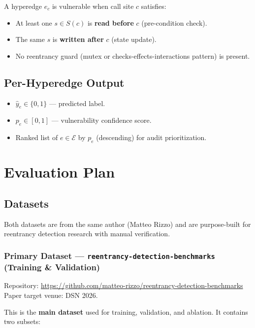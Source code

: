 \documentclass[11pt]{article}
\begin{document}
A hyperedge $e_c$ is vulnerable when call site $c$ satisfies:
\begin{itemize}
    \item At least one $s \in S(c)$ is \textbf{read before} $c$ (pre-condition check).
    \item The same $s$ is \textbf{written after} $c$ (state update).
    \item No reentrancy guard (mutex or checks-effects-interactions pattern) is present.
\end{itemize}

\subsection{Per-Hyperedge Output}

\begin{itemize}
    \item $\hat{y}_e \in \{0,1\}$ --- predicted label.
    \item $p_e \in [0,1]$ --- vulnerability confidence score.
    \item Ranked list of $e \in \mathcal{E}$ by $p_e$ (descending) for audit prioritization.
\end{itemize}

\section{Evaluation Plan}

\subsection{Datasets}

Both datasets are from the same author (Matteo Rizzo) and are purpose-built for reentrancy detection research with manual verification.

\subsubsection{Primary Dataset --- \texttt{reentrancy-detection-benchmarks} (Training \& Validation)}

Repository: \url{https://github.com/matteo-rizzo/reentrancy-detection-benchmarks}\\
Paper target venue: DSN 2026.

This is the \textbf{main dataset} used for training, validation, and ablation. It contains two subsets:
\end{document}
